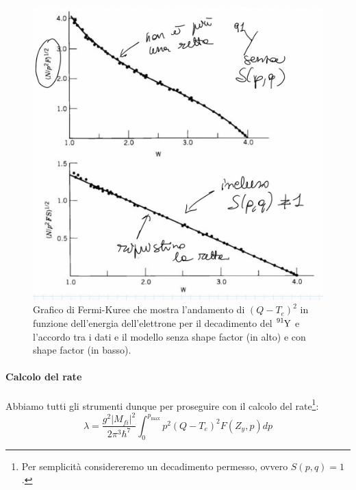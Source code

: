 \begin{figure}[h]
    \centering
    \includegraphics[scale=0.2]{Immagini/0304_andamenti4.png}
    \caption{Grafico di Fermi-Kuree che mostra l'andamento di $(Q-T_e)^2$ in funzione dell'energia dell'elettrone per il decadimento del $\ce{^{91}Y}$ e l'accordo tra i dati e il modello senza shape factor (in alto) e con shape factor (in basso).}
    \label{0304_qvalue2}
\end{figure}

\paragraph{Calcolo del rate} Abbiamo tutti gli strumenti dunque per proseguire con il calcolo del rate\footnote{Per semplicità considereremo un decadimento permesso, ovvero $S(p,q)=1$.}:
$$\lambda = \frac{g^2 |M_{fi}|^2}{2\pi^3 \hbar^7}\int_0^{p_{\max}} p^2 (Q-T_e)^2 F(Z_y,p) dp $$

